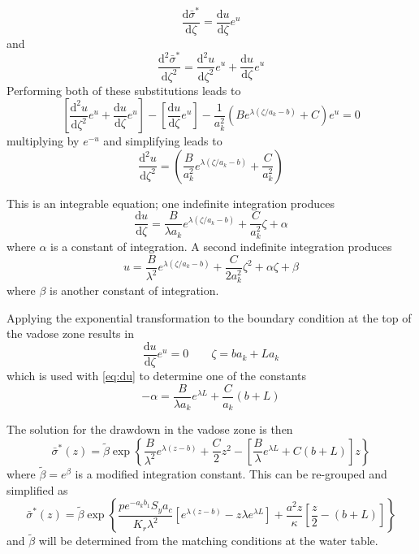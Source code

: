 \documentclass[11pt]{article}
\begin{document}
$$\frac{\mathrm{d}\bar{\sigma}^{\ast}}{\mathrm{d}\zeta} =
\frac{\mathrm{d}u}{\mathrm{d}\zeta}e^u$$ 
and
$$\frac{\mathrm{d}^2\bar{\sigma}^{\ast}}{\mathrm{d}\zeta^2} =
\frac{\mathrm{d}^2u}{\mathrm{d}\zeta^2}e^u +
\frac{\mathrm{d}u}{\mathrm{d}\zeta}e^u$$
Performing both of these substitutions leads to
$$ \left[ \frac{\mathrm{d}^2u}{\mathrm{d}\zeta^2}e^u +
  \frac{\mathrm{d}u}{\mathrm{d}\zeta}e^u \right]-  \left[
  \frac{\mathrm{d}u}{\mathrm{d}\zeta}e^u \right]- \frac{1}{a_k^2}\left( B e^{\lambda (\zeta/a_k-b)} + C\right) e^{u}=0$$
multiplying by $e^{-u}$ and simplifying leads to
\begin{equation}
  \label{eq:expsubODE}
   \frac{\mathrm{d}^2 u}{\mathrm{d}\zeta^2} = \left( \frac{B}{a_k^2} e^{\lambda (\zeta/a_k-b)} + \frac{C}{a_k^2}\right) 
\end{equation}

This is an integrable equation; one indefinite integration produces
\begin{equation}
  \label{eq:du}
  \frac{\mathrm{d} u}{\mathrm{d}\zeta} =  \frac{B}{\lambda a_k} e^{\lambda (\zeta/a_k-b)} + \frac{C}{a_k^2}\zeta + \alpha
\end{equation}
where $\alpha$ is a constant of integration. A second indefinite integration produces
$$ u =  \frac{B}{\lambda^2} e^{\lambda (\zeta/a_k-b)} + \frac{C}{2a_k^2}\zeta^2 + \alpha\zeta + \beta  $$
where $\beta$ is another constant of integration.  

Applying the exponential transformation to the boundary condition at the top of the vadose zone results in
$$\frac{\mathrm{d}u}{\mathrm{d}\zeta} e^u=0 \qquad \zeta=ba_k + La_k$$
which is used with \eqref{eq:du} to determine one of the constants
$$-\alpha= \frac{B}{\lambda a_k} e^{\lambda L} + \frac{C}{a_k} \left( b+L\right) $$

The solution for the drawdown in the vadose zone is then
\begin{equation}
  \nonumber
  \bar{\sigma}^{\ast} (z) = \tilde{\beta}\exp\left\{ \frac{B}{\lambda^2} e^{\lambda (z-b)} + \frac{C}{2}z^2 -\left[\frac{B}{\lambda} e^{\lambda L} + C \left( b+L\right)\right]z  \right\}
\end{equation}
where $\tilde{\beta}=e^\beta$ is a modified integration constant. This can be re-grouped and simplified as
\begin{equation}
  \label{eq:sigma}
  \bar{\sigma}^{\ast} (z) = \tilde{\beta}\exp\left\{ \frac{p e^{-a_k b_1} S_y a_c} {K_r \lambda^2} \left[ e^{\lambda (z-b)}  - z\lambda e^{\lambda L} \right]+ \frac{a^2 z}{\kappa}\left[\frac{z}{2} - \left( b+L\right) \right]  \right\}
\end{equation}
and $\tilde{\beta}$ will be determined from the matching conditions at the water table.
\end{document}
